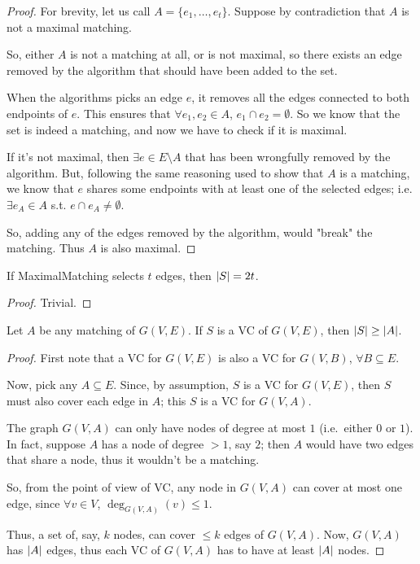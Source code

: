     \begin{proof}
        For brevity, let us call $A = \{ e_1, \dots, e_t \}$.
        Suppose by contradiction that $A$ is not a maximal matching.

        So, either $A$ is not a matching at all, or is not maximal, so there exists an edge removed by the algorithm that should have been added to the set.

        When the algorithms picks an edge $e$, it removes all the edges connected to both endpoints of $e$. This ensures that $\forall e_1,e_2 \in A$, $e_1 \cap e_2 = \emptyset$.
        So we know that the set is indeed a matching, and now we have to check if it is maximal.

        If it's not maximal, then $\exists e \in E \setminus A$ that has been wrongfully removed by the algorithm.
        But, following the same reasoning used to show that $A$ is a matching, we know that $e$ shares some endpoints with at least one of the selected edges; i.e. $\exists e_A \in A$ s.t. $e \cap e_A \neq \emptyset$.

        So, adding any of the edges removed by the algorithm, would "break" the matching. Thus $A$ is also maximal.
    \end{proof}

    \begin{lemma}\label{lemma:vc2}
        If MaximalMatching selects $t$ edges, then $\vert S \vert = 2t$.
    \end{lemma}

    \begin{proof}
        Trivial.
    \end{proof}

    \begin{lemma}\label{lemma:vc3}
        Let $A$ be any matching of $G(V,E)$. If $S$ is a VC of $G(V,E)$, then $\vert S \vert \geq \vert A \vert$.
    \end{lemma}

    \begin{proof}
        First note that a VC for $G(V,E)$ is also a VC for $G(V,B)$, $\forall B \subseteq E$.

        Now, pick any $A \subseteq E$. Since, by assumption, $S$ is a VC for $G(V,E)$, then $S$ must also cover each edge in $A$; this $S$ is a VC for $G(V,A)$.

        The graph $G(V,A)$ can only have nodes of degree at most $1$ (i.e.~either $0$ or $1$).
        In fact, suppose $A$ has a node of degree $>1$, say $2$; then $A$ would have two edges that share a node, thus it wouldn't be a matching.

        So, from the point of view of VC, any node in $G(V,A)$ can cover at most one edge, since $\forall v \in V$, $\deg_{G(V,A)}(v) \leq 1$.

        Thus, a set of, say, $k$ nodes, can cover $\leq k$ edges of $G(V,A)$. Now, $G(V,A)$ has $\vert A \vert$ edges, thus each VC of $G(V,A)$ has to have at least $\vert A \vert$ nodes.
    \end{proof}

